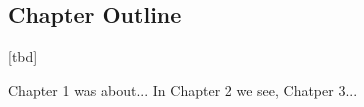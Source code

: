 



\subsection{Chapter Outline}

[tbd]


Chapter 1 was about...
In Chapter 2 we see,
Chatper 3...













